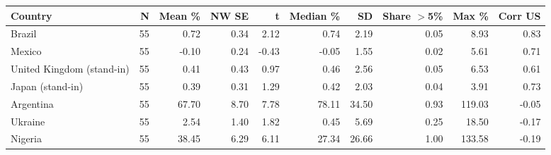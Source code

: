 \begin{tabular}{lrrrrrrrrr}
\hline
Country & N & Mean \% & NW SE & t & Median \% & SD & Share $>$5\% & Max \% & Corr US \\
\hline
Brazil & 55 & 0.72 & 0.34 & 2.12 & 0.74 & 2.19 & 0.05 & 8.93 & 0.83 \\
Mexico & 55 & -0.10 & 0.24 & -0.43 & -0.05 & 1.55 & 0.02 & 5.61 & 0.71 \\
United Kingdom (stand-in) & 55 & 0.41 & 0.43 & 0.97 & 0.46 & 2.56 & 0.05 & 6.53 & 0.61 \\
Japan (stand-in) & 55 & 0.39 & 0.31 & 1.29 & 0.42 & 2.03 & 0.04 & 3.91 & 0.73 \\
Argentina & 55 & 67.70 & 8.70 & 7.78 & 78.11 & 34.50 & 0.93 & 119.03 & -0.05 \\
Ukraine & 55 & 2.54 & 1.40 & 1.82 & 0.45 & 5.69 & 0.25 & 18.50 & -0.17 \\
Nigeria & 55 & 38.45 & 6.29 & 6.11 & 27.34 & 26.66 & 1.00 & 133.58 & -0.19 \\
\hline
\end{tabular}
